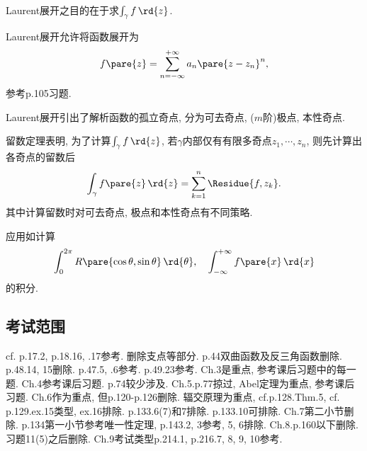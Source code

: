 \documentclass[../ComplexVariable.tex]{subfiles}
\begin{document}
Laurent展开之目的在于求$\int_\gamma f\,\rd{z}$.
\par
Laurent展开允许将函数展开为
\[ f\pare{z} = \sum_{n=-\infty}^{+\infty} a_n\pare{z-z_n}^n, \]
参考p.105习题.
\par
Laurent展开引出了解析函数的孤立奇点, 分为可去奇点, ($m$阶)极点, 本性奇点.
\par
留数定理表明, 为了计算$\int_\gamma f\,\rd{z}$, 若$\gamma$内部仅有有限多奇点$z_1,\cdots,z_n$, 则先计算出各奇点的留数后
\[ \int_\gamma f\pare{z}\,\rd{z} = \sum_{k=1}^n \Residue{f,z_k}. \]
其中计算留数时对可去奇点, 极点和本性奇点有不同策略.
\par
应用如计算
\[ \int_0^{2\pi} R\pare{\cos\theta,\sin\theta}\,\rd{\theta},\quad \int_{-\infty}^{+\infty} f\pare{x}\,\rd{x} \]
的积分.


\subsection{考试范围} %
\label{sub:考试范围}

cf. p.17.2, p.18.16, .17参考. 删除支点等部分. p.44双曲函数及反三角函数删除. p.48.14, 15删除. p.47.5, .6参考. p.49.23参考. Ch.3是重点, 参考课后习题中的每一题. Ch.4参考课后习题. p.74较少涉及. Ch.5.p.77掠过, Abel定理为重点, 参考课后习题. Ch.6作为重点, 但p.120-p.126删除. 辐交原理为重点, cf.p.128.Thm.5, cf. p.129.ex.15类型, ex.16排除. p.133.6(7)和7排除. p.133.10可排除. Ch.7第二小节删除. p.134第一小节参考唯一性定理, p.143.2, 3参考, 5, 6排除. Ch.8.p.160以下删除. 习题11(5)之后删除. Ch.9考试类型p.214.1, p.216.7, 8, 9, 10参考.


\end{document}
